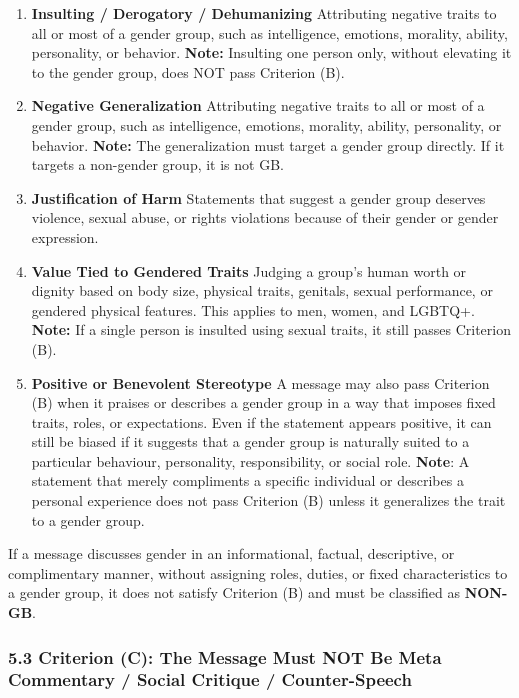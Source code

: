 \documentclass[12pt,oneside,openright,a4paper]{cpe-english-project}
\begin{document}
\begin{enumerate}
\setlength{\itemsep}{0.15\baselineskip}
\setlength{\parsep}{0pt}
\setlength{\parskip}{0pt}
\def\labelenumi{\arabic{enumi}.}
\item
  \textbf{Insulting / Derogatory / Dehumanizing}
  Attributing negative traits to all or most of a gender group, such as
  intelligence, emotions, morality, ability, personality, or behavior.
  \textbf{Note:} Insulting one person only, without elevating it to the
  gender group, does NOT pass Criterion (B).
\item
  \textbf{Negative Generalization}
  Attributing negative traits to all or most of a gender group, such as
  intelligence, emotions, morality, ability, personality, or behavior.
  \textbf{Note:} The generalization must target a gender group directly.
  If it targets a non-gender group, it is not GB.
\item
  \textbf{Justification of Harm}
  Statements that suggest a gender group deserves violence, sexual
  abuse, or rights violations because of their gender or gender
  expression.
\item
  \textbf{Value Tied to Gendered Traits}
  Judging a group's human worth or dignity based on body size, physical
  traits, genitals, sexual performance, or gendered physical features.
  This applies to men, women, and LGBTQ+.
  \textbf{Note:} If a single person is insulted using sexual traits, it
  still passes Criterion (B).
\item
  \textbf{Positive or Benevolent Stereotype}
  A message may also pass Criterion (B) when it praises or describes a
  gender group in a way that imposes fixed traits, roles, or
  expectations. Even if the statement appears positive, it can still be
  biased if it suggests that a gender group is naturally suited to a
  particular behaviour, personality, responsibility, or social role.
  \textbf{Note}: A statement that merely compliments a specific
  individual or describes a personal experience does not pass Criterion
  (B) unless it generalizes the trait to a gender group.
\end{enumerate}

If a message discusses gender in an informational, factual, descriptive,
or complimentary manner, without assigning roles, duties, or fixed
characteristics to a gender group, it does not satisfy Criterion (B) and
must be classified as \textbf{NON-GB}.

\subsubsection{5.3 Criterion (C): The Message Must NOT Be Meta Commentary / Social Critique / Counter-Speech}\label{criterion-c-the-message-must-not-be-meta-commentary-social-critique-counter-speech}
\end{document}
